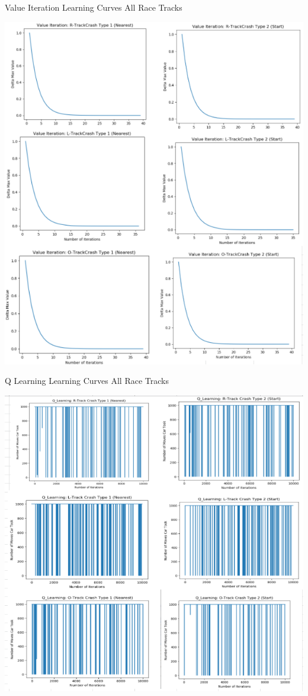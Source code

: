 \documentclass[twoside,11pt]{article}
\begin{document}
\newpage

\begin{table}[h]
		\centering
		\caption{Value Iteration Learning Curves All Race Tracks }
		\label{tab:table1}
		\includegraphics[scale=1]{ValIter_All_TrainCurve}\newline
\end{table}

\newpage

\begin{table}[h]
	\centering
	\caption{Q Learning Learning Curves All Race Tracks }
	\label{tab:table2}
	\includegraphics[scale=.9]{Q_All_TrainCurve}\newline
\end{table}
\end{document}

